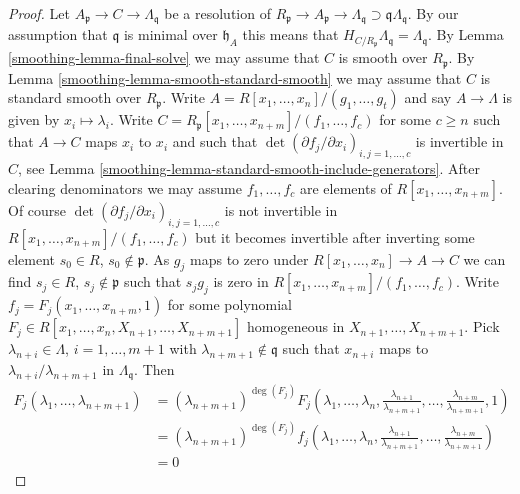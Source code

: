 \begin{proof}

Let $A_\mathfrak p \to C \to \Lambda_\mathfrak q$ be a resolution of
$R_\mathfrak p \to A_\mathfrak p \to \Lambda_\mathfrak q
\supset \mathfrak q\Lambda_\mathfrak q$. By our assumption
that $\mathfrak q$ is minimal over $\mathfrak h_A$ this
means that $H_{C/R_\mathfrak p} \Lambda_\mathfrak q = \Lambda_\mathfrak q$.
By Lemma \ref{smoothing-lemma-final-solve}
we may assume that $C$ is smooth over $R_\mathfrak p$.
By Lemma \ref{smoothing-lemma-smooth-standard-smooth} we may assume that
$C$ is standard smooth over $R_\mathfrak p$.
Write $A = R[x_1, \ldots, x_n]/(g_1, \ldots, g_t)$ and say
$A \to \Lambda$ is given by $x_i \mapsto \lambda_i$.
Write $C = R_\mathfrak p[x_1, \ldots, x_{n + m}]/(f_1, \ldots, f_c)$
for some $c \geq n$ such that $A \to C$ maps $x_i$ to $x_i$ and such that
$\det(\partial f_j/\partial x_i)_{i, j = 1, \ldots, c}$
is invertible in $C$, see
Lemma \ref{smoothing-lemma-standard-smooth-include-generators}.
After clearing denominators we may assume
$f_1, \ldots, f_c$ are elements of $R[x_1, \ldots, x_{n + m}]$.
Of course
$\det(\partial f_j/\partial x_i)_{i, j = 1, \ldots, c}$
is not invertible in $R[x_1, \ldots, x_{n + m}]/(f_1, \ldots, f_c)$
but it becomes invertible after inverting some element $s_0 \in R$,
$s_0 \not \in \mathfrak p$.
As $g_j$ maps to zero under $R[x_1, \ldots, x_n] \to A \to C$
we can find $s_j \in R$, $s_j \not \in \mathfrak p$ such that
$s_j g_j$ is zero in $R[x_1, \ldots, x_{n + m}]/(f_1, \ldots, f_c)$.
Write $f_j = F_j(x_1, \ldots, x_{n + m}, 1)$
for some polynomial
$F_j \in R[x_1, \ldots, x_n, X_{n + 1}, \ldots, X_{n + m + 1}]$
homogeneous in $X_{n + 1}, \ldots, X_{n + m + 1}$.
Pick $\lambda_{n + i} \in \Lambda$, $i = 1, \ldots, m + 1$ with
$\lambda_{n + m + 1} \not \in \mathfrak q$ such that $x_{n + i}$ maps to
$\lambda_{n + i}/\lambda_{n + m + 1}$ in $\Lambda_\mathfrak q$.
Then
\begin{align*}
F_j(\lambda_1, \ldots, \lambda_{n + m + 1})
& =
(\lambda_{n + m + 1})^{\deg(F_j)} F_j(\lambda_1, \ldots, \lambda_n,
\frac{\lambda_{n + 1}}{\lambda_{n + m + 1}}, \ldots,
\frac{\lambda_{n + m}}{\lambda_{n + m + 1}}, 1) \\
& =
(\lambda_{n + m + 1})^{\deg(F_j)} f_j(\lambda_1, \ldots, \lambda_n,
\frac{\lambda_{n + 1}}{\lambda_{n + m + 1}}, \ldots,
\frac{\lambda_{n + m}}{\lambda_{n + m + 1}}) \\
& = 0

\end{align*}
\end{proof}
